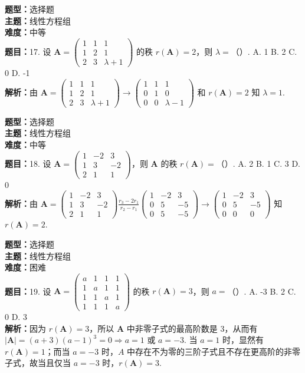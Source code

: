 \documentclass{ctexart}
\newenvironment{question}[5]{%
	\noindent\textbf{题型：}#1\\
	\textbf{主题：}#2\\
	\textbf{难度：}#3\\
	\textbf{题目：}#4\\
	\textbf{解析：}#5\\
	\vspace{1em}
}{}
\begin{document}
	\begin{question}
		{选择题}
		{线性方程组}
		{中等}
		{17. 设 \(\mathbf{A}=\left(\begin{array}{ccc}1 & 1 & 1 \\ 1 & 2 & 1 \\ 2 & 3 & \lambda+1\end{array}\right)\) 的秩 \(r(\mathbf{A})=2\)，则 \(\lambda=\)（）. 
			A. 1
			B. 2
			C. 0
			D. -1}
		{由 \(\mathbf{A}=\left(\begin{array}{ccc}1 & 1 & 1 \\ 1 & 2 & 1 \\ 2 & 3 & \lambda+1\end{array}\right) \rightarrow\left(\begin{array}{ccc}1 & 1 & 1 \\ 0 & 1 & 0 \\ 0 & 0 & \lambda-1\end{array}\right)\) 和 \(r(\mathbf{A})=2\) 知 \(\lambda=1\). }
	\end{question}
	
	\begin{question}
		{选择题}
		{线性方程组}
		{中等}
		{18. 设 \(\mathbf{A}=\left(\begin{array}{ccc}1 & -2 & 3 \\ 1 & 3 & -2 \\ 2 & 1 & 1\end{array}\right)\)，则 \(\mathbf{A}\) 的秩 \(r(\mathbf{A})=\)（）. 
			A. 2
			B. 1
			C. 3
			D. 0}
		{由 \(\mathbf{A}=\left(\begin{array}{ccc}1 & -2 & 3 \\ 1 & 3 & -2 \\ 2 & 1 & 1\end{array}\right) \frac{r_3-2 r_1}{r_2-r_1}\left(\begin{array}{ccc}1 & -2 & 3 \\ 0 & 5 & -5 \\ 0 & 5 & -5\end{array}\right) \rightarrow\left(\begin{array}{ccc}1 & -2 & 3 \\ 0 & 5 & -5 \\ 0 & 0 & 0\end{array}\right)\) 知 \(r(\mathbf{A})=2\). }
	\end{question}
	
	\begin{question}
		{选择题}
		{线性方程组}
		{困难}
		{19. 设 \(\mathbf{A}=\left(\begin{array}{cccc}a & 1 & 1 & 1 \\ 1 & a & 1 & 1 \\ 1 & 1 & a & 1 \\ 1 & 1 & 1 & a\end{array}\right)\) 的秩 \(r(\mathbf{A})=3\)，则 \(a=\)（）. 
			A. -3
			B. 2
			C. 0
			D. 3}
		{因为 \(r(\mathbf{A})=3\)，所以 \(\mathbf{A}\) 中非零子式的最高阶数是 3，从而有 \(|\mathbf{A}|=(a+3)(a-1)^3=0 \Rightarrow a=1\) 或 \(a=-3\). 当 \(a=1\) 时，显然有 \(r(\mathbf{A})=1\)；而当 \(a=-3\) 时，\(A\) 中存在不为零的三阶子式且不存在更高阶的非零子式，故当且仅当 \(a=-3\) 时，\(r(\mathbf{A})=3\). }
	\end{question}
	
\end{document}
